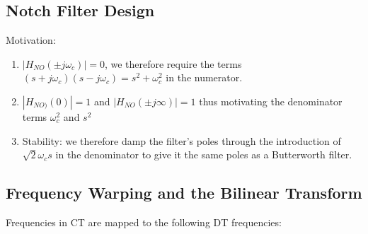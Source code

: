 \documentclass[8pt,a4paper]{scrartcl}
\begin{document}
\begin{multicols*}{3}
{\begin{enumerate}

\end{enumerate}
}

\subsection{Notch Filter Design}



Motivation:
\begin{enumerate}
\ncompaq
\item $|H_{NO}(\pm j\omega_c)|=0$, we therefore require the terms $(s+j\omega_c)(s-j\omega_c)=s^2+\omega_c^2$ in the numerator.
\item $|H_{NO)}(0)|=1$ and $|H_{NO}(\pm j\infty)|=1$ thus motivating the denominator terms $\omega_c^2$ and $s^2$
\item Stability: we therefore damp the filter's poles through the introduction of $\sqrt{2}\omega_c s$ in the denominator to give it the same poles as a Butterworth filter.
\end{enumerate}



\subsection{Frequency Warping and the Bilinear Transform}


Frequencies in CT are mapped to the following DT frequencies:



\end{multicols*}
\end{document}
